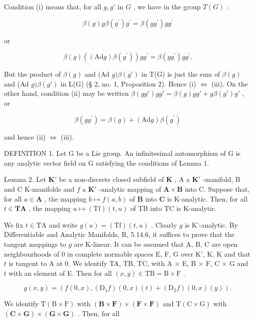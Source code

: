 Condition (i) means that, for all \(g, g'\) in \(G\) , we have in the group \(T(G)\) :

\[
\beta (g) g \beta (g ^ {\prime}) g ^ {\prime} = \beta (g g ^ {\prime}) g g ^ {\prime}
\]

or

\[
\beta (g) ((\mathrm{Ad} g) \beta (g ^ {\prime})) g g ^ {\prime} = \beta (g g ^ {\prime}) g g ^ {\prime}.
\]

But the product of \(\beta(g)\) and (Ad \(g)\beta(g')\) in T(G) is just the sum of \(\beta(g)\) and (Ad \(g)\beta(g')\) in L(G) (§ 2, no. 1, Proposition 2). Hence (i) \(\Leftrightarrow\) (iii). On the other hand, condition (ii) may be written \(\beta(gg')gg' = \beta(g)gg' + g\beta(g')g'\) , or

\[
\beta (g g ^ {\prime}) = \beta (g) + (\mathrm{Ad} g) \beta (g ^ {\prime})
\]

and hence (ii) \(\Leftrightarrow\) (iii).

DEFINITION 1. Let G be a Lie group. An infinitesimal automorphism of G is any analytic vector field on G satisfying the conditions of Lemma 1.

Lemma 2. Let \(\mathbf{K}'\) be a non-discrete closed subfield of \(\mathbf{K}\) , A a \(\mathbf{K}'\) -manifold, B and C K-manifolds and \(f\) a \(\mathbf{K}'\) -analytic mapping of \(\mathbf{A} \times \mathbf{B}\) into C. Suppose that, for all \(a \in \mathbf{A}\) , the mapping \(b \mapsto f(a, b)\) of \(\mathbf{B}\) into \(\mathbf{C}\) is K-analytic. Then, for all \(t \in \mathbf{TA}\) , the mapping \(u \mapsto (\mathrm{Tf})(t, u)\) of TB into TC is K-analytic.

We fix \(t \in \mathrm{TA}\) and write \(g(u) = (\mathrm{Tf})(t,u)\) . Clearly \(g\) is K'-analytic. By Differentiable and Analytic Manifolds, R, 5.14.6, it suffices to prove that the tangent mappings to \(g\) are K-linear. It can be assumed that A, B, C are open neighbourhoods of 0 in complete normable spaces E, F, G over K', K, K and that \(t\) is tangent to A at 0. We identify TA, TB, TC, with A × E, B × F, C × G and \(t\) with an element of E. Then for all \((x,y) \in \mathrm{TB} = \mathrm{B} \times \mathrm{F}\) .

\[
g (x, y) = \left(f (0, x), \left(\mathrm{D} _ {1} f\right) (0, x) (t) + \left(\mathrm{D} _ {2} f\right) (0, x) (y)\right).
\]

We identify \(\mathrm{T(B\times F)}\) with \((\mathbf{B}\times \mathbf{F})\times (\mathbf{F}\times \mathbf{F})\) and \(\mathrm{T(C\times G)}\) with \((\mathbf{C}\times \mathbf{G})\times (\mathbf{G}\times \mathbf{G})\) . Then, for all

